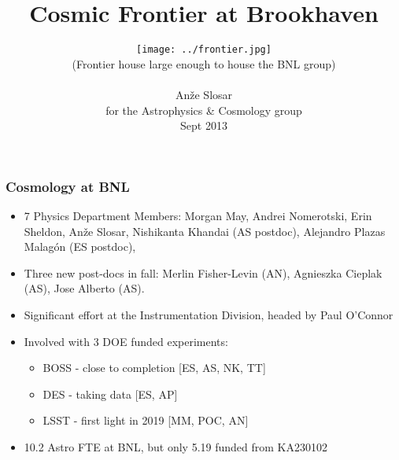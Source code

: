 \documentclass{beamer}
\begin{document}
\title{Cosmic Frontier at Brookhaven }

\author{
\texttt{[image: ../frontier.jpg]}\\
{\tiny (Frontier house large enough to house the BNL group)}
\\ 
\vspace*{0.5cm}
\begin{minipage}{7cm}\begin{centering}An\v{z}e Slosar\\ 
for the Astrophysics \& Cosmology group \\
Sept 2013\\
\end{centering}\end{minipage}  
}
\date{}


\begin{frame}\frametitle{Cosmology at BNL} 
  \begin{itemize}
  \item 7 Physics Department Members: Morgan May, Andrei Nomerotski, Erin Sheldon,
    An\v{z}e Slosar, 
    Nishikanta Khandai (AS postdoc),  Alejandro Plazas Malag\'{o}n  (ES postdoc),
  \item Three new post-docs in fall: Merlin Fisher-Levin (AN),
    Agnieszka Cieplak (AS), Jose Alberto (AS).
\item Significant effort at the Instrumentation Division, headed by Paul O'Connor
\item Involved with 3 DOE funded experiments:
\begin{itemize}
\item BOSS - close to completion [ES, AS, NK, TT]
\item DES -  taking data [ES, AP]
\item LSST - first light in 2019 [MM, POC, AN] 
\end{itemize}

\item 10.2 Astro FTE at BNL, but only 5.19 funded from KA230102

\end{itemize}
\end{frame}
\end{document}
